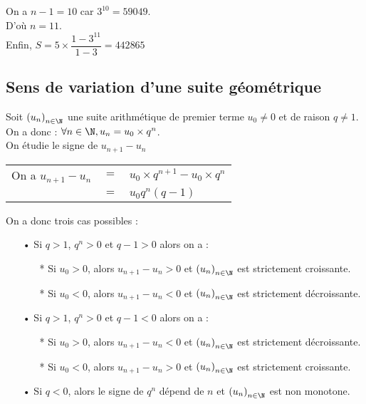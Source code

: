 On a $n - 1 = 10$ car $3^{10} = 59049$. \\

D'où $n = 11$. \\

Enfin, $S = 5 \times \dfrac{1 - 3^{11}}{1 - 3} = 442 865$ 

\vspace*{-5cm}

\newpage

\vspace*{-1.4cm}

\subsection{Sens de variation d'une suite géométrique}

Soit $\left(u_n\right)_{n \in \N}$ une suite arithmétique de premier terme $u_0 \neq 0$ et de raison $q \neq 1$. \\

On a donc : $\forall n \in \N, u_{n} = u_0 \times q^n$. \\

On étudie le signe de $u_{n+1} - u_{n}$ \\

\begin{tabular}{lll}
On a  $u_{n+1} - u_{n}$ & $ = $ &$ u_0 \times q^{n+1} - u_0 \times q^{n}$ \\
& $=$ & $u_0q^n \left(q-1\right)$
\end{tabular}

\vspace*{.3cm}

On a donc trois cas possibles : \\
\begin{itemize}
\item[•] Si $q > 1$, $q^n > 0$ et $q - 1 > 0$ alors on a :
\begin{itemize}
\item[*] Si $u_0 > 0$, alors $u_{n+1} - u_n > 0$ et $\left(u_n\right)_{n \in \N}$ est strictement croissante. \\
\item[*] Si $u_0 < 0$, alors $u_{n+1} - u_n < 0$ et $\left(u_n\right)_{n \in \N}$ est strictement décroissante. \\
\end{itemize} 
\item[•] Si $q > 1$, $q^n > 0$ et $q - 1 < 0$ alors on a :
\begin{itemize}
\item[*] Si $u_0 > 0$, alors $u_{n+1} - u_n < 0$ et $\left(u_n\right)_{n \in \N}$ est strictement décroissante. \\
\item[*] Si $u_0 < 0$, alors $u_{n+1} - u_n > 0$ et $\left(u_n\right)_{n \in \N}$ est strictement croissante. \\
\end{itemize} 
\item[•] Si $q < 0$, alors le signe de $q^n$ dépend de $n$ et $\left(u_n\right)_{n \in \N}$ est non monotone.
\end{itemize}

